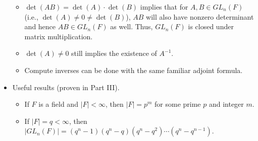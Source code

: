 \documentclass[../notes.tex]{subfiles}
\begin{document}
\begin{itemize}
\begin{itemize}
        \item $\det(AB)=\det(A)\cdot\det(B)$ implies that for $A,B\in GL_n(F)$ (i.e., $\det(A)\neq 0\neq\det(B)$), $AB$ will also have nonzero determinant and hence $AB\in GL_n(F)$ as well. Thus, $GL_n(F)$ is closed under matrix multiplication.
        \item $\det(A)\neq 0$ still implies the existence of $A^{-1}$.
        \item Compute inverses can be done with the same familiar adjoint formula.
    \end{itemize}
    \item Useful results (proven in Part III).
    \begin{itemize}
        \item If $F$ is a field and $|F|<\infty$, then $|F|=p^m$ for some prime $p$ and integer $m$.
        \item If $|F|=q<\infty$, then $|GL_n(F)|=(q^n-1)(q^n-q)(q^n-q^2)\cdots(q^n-q^{n-1})$.
    \end{itemize}
\end{itemize}
\end{document}
